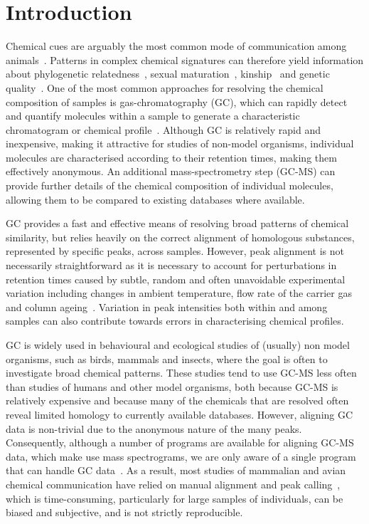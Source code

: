 \documentclass[10pt,letterpaper]{article}
\begin{document}
\section*{Introduction}
Chemical cues are arguably the most common mode of communication among animals~\cite{Wyatt.2014}. Patterns in complex chemical signatures can therefore yield information about phylogenetic relatedness~\cite{Meulemeester.2011}, sexual maturation~\cite{Caspers.2011}, kinship~\cite{Bonadonna.2012, Krause.2012, Stoffel.2015} and genetic quality~\cite{Charpentier.2010, Leclaire.2012, Stoffel.2015}. One of the most common approaches for resolving the chemical composition of samples is gas-chromatography (GC), which can rapidly detect and quantify molecules within a sample to generate a characteristic chromatogram or chemical profile~\cite{McNair.2011}. Although GC is relatively rapid and inexpensive, making it attractive for studies of non-model organisms, individual molecules are characterised according to their retention times, making them effectively anonymous.  An additional mass-spectrometry step (GC-MS) can provide further details of the chemical composition of individual molecules, allowing them to be compared to existing databases where available.\par
GC provides a fast and effective means of resolving broad patterns of chemical similarity, but relies heavily on the correct alignment of homologous substances, represented by specific peaks, across samples.  However, peak alignment is not necessarily straightforward as it is necessary to account for perturbations in retention times caused by subtle, random and often unavoidable experimental variation including changes in ambient temperature, flow rate of the carrier gas and column ageing~\cite{Scott.2003, Pierce.2005}.  Variation in peak intensities both within and among samples can also contribute towards errors in characterising chemical profiles. \par
GC is widely used in behavioural and ecological studies of (usually) non model organisms, such as birds, mammals and insects, where the goal is often to investigate broad chemical patterns.  These studies tend to use GC-MS less often than studies of humans and other model organisms, both because GC-MS is relatively expensive and because many of the chemicals that are resolved often reveal limited homology to currently available databases. However, aligning GC data is non-trivial due to the anonymous nature of the many peaks. Consequently, although a number of programs are available for aligning GC-MS data, which make use mass spectrograms, we are only aware of a single program that can handle GC data~\cite{Dellicour.2013}.  As a result, most studies of mammalian and avian chemical communication have relied on manual alignment and peak calling~\cite{Drea.2013}, which is time-consuming, particularly for large samples of individuals, can be biased and subjective, and is not strictly reproducible. \par
\end{document}
